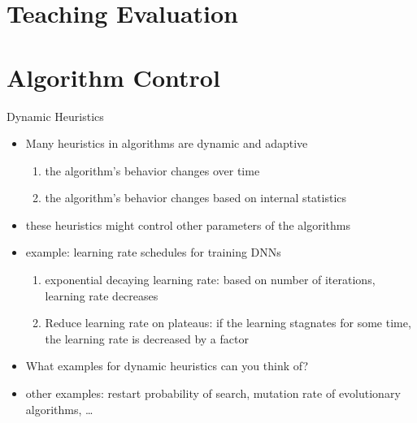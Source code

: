 \section{Teaching Evaluation}

\section{Algorithm Control}
\begin{frame}[c]{Dynamic Heuristics}

\begin{itemize}
	\item Many heuristics in algorithms are dynamic and adaptive
	\begin{enumerate}
		\item the algorithm's behavior changes over time
		\item the algorithm's behavior changes based on internal statistics
	\end{enumerate}
	\medskip
	\item these heuristics might control other parameters of the algorithms
	\pause
	\smallskip
	\item example: learning rate schedules for training DNNs
	\begin{enumerate}
		\item exponential decaying learning rate: based on number of iterations, learning rate decreases
		\pause
		\item Reduce learning rate on plateaus: if the learning stagnates for some time, the learning rate is decreased by a factor
	\end{enumerate}
	\pause
	\item What examples for dynamic heuristics can you think of? \hands
	\pause
	\item other examples: restart probability of search, mutation rate of evolutionary algorithms, \ldots  
	
\end{itemize}

\end{frame}
